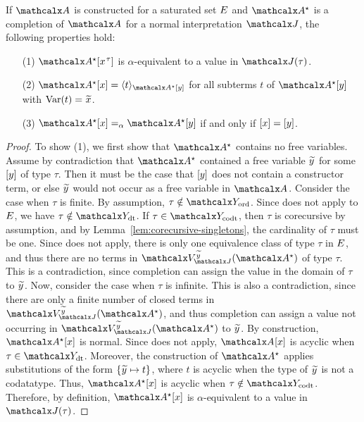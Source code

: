 \begin{lemma}
\label{lem:interpretation-completion}
If $\Val$ is constructed for a saturated set $E$
and $\ValC$ is a completion of $\Val$ for a normal interpretation $\J$, the following properties hold:
\begin{enumerate}
\item[\rm (1)] $\ValC \ec{x\typ{\tau}}$ is $\alpha$-equivalent to a value in $\interp{\J}{\tau}$.
\item[\rm (2)]
$\ValC \ec{x} = \expand{\ValC \ec{y}}{ t }$ for
all subterms $t$ of $\ValC \ec{y}$ with $\muvar(t) = {\Varec{x}}$.
\item[\rm (3)]
$\ValC \ec{x} \vsim \ValC \ec{y}$ if and only if $[x] = [y]$.
\end{enumerate}
\end{lemma}
\begin{rep}
\begin{proof}
To show (1), we first show that $\ValC$ contains no free variables.
Assume by contradiction that $\ValC$ contained a free variable ${\Varec{y}}$ for some $[y]$ of type $\tau$.
Then it must be the case that $[y]$ does not contain a constructor term,
or else ${\Varec{y}}$ would not occur as a free variable in $\Val$.
Consider the case when $\tau$ is finite.
By assumption, $\tau \notin \Nondata$.
Since  does not apply to $E$, we have $\tau \notin \Data$.
If $\tau \in \Codata$, then $\tau$ is corecursive by assumption, and by Lemma~\ref{lem:corecursive-singletons},
the cardinality of $\tau$ must be one.
Since  does not apply, %
there is only one equivalence class of type $\tau$ in $E$,
and thus there are no terms in $\BAD_{\smash{\J}}^{\Varec{y}}(\ValC)$ of type $\tau$.
This is a contradiction, since %
completion can assign the value in the domain of $\tau$ to ${\Varec{y}}$.
Now, consider the case when $\tau$ is infinite.
This is also a contradiction,
since there are only a finite number of closed terms in $\BAD_{\smash{\J}}^{\Varec{y}}(\ValC)$,
and thus %
completion can assign a value not occurring in $\BAD_{\smash{\J}}^{\Varec{y}}(\ValC)$ to ${\Varec{y}}$.
By construction, $\ValC \ec{x}$ is normal.
Since  does not apply, $\Val \ec{x}$ is acyclic when $\tau \in \Data$.
Moreover, the construction of $\ValC$ applies substitutions of the form
$\{ {\Varec{y}} \mapsto t \}$, where $t$ is acyclic when the type of ${\Varec{y}}$ is not a codatatype.
Thus, $\ValC \ec{x}$ is acyclic when $\tau \notin \Codata$.
Therefore, by definition, $\ValC \ec{x}$ is $\alpha$-equivalent to a value in $\interp{\J}{\tau}$.


\end{proof}
\end{rep}
